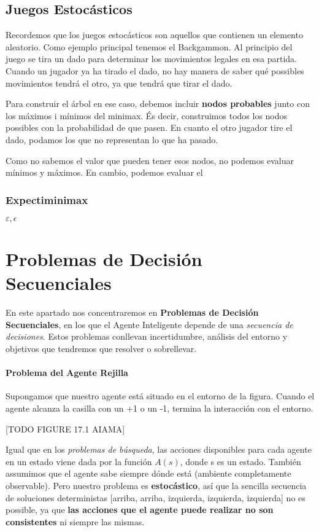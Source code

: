 \documentclass[12pt,a4paper,catalan, leqno]{article} %
\theoremstyle{definition}
\begin{document}
\subsection{Juegos Estocásticos}

Recordemos que los juegos estocásticos son aquellos que contienen un elemento aleatorio. Como ejemplo principal tenemos el Backgammon. Al principio del juego se tira un dado para determinar los movimientos legales en esa partida. Cuando un jugador ya ha tirado el dado, no hay manera de saber qué possibles movimientos tendrá el otro, ya que tendrá que tirar el dado.

Para construir el árbol en ese caso, debemos incluir \textbf{nodos probables} junto con los máximos i mínimos del minimax. És decir, construimos todos los nodos possibles con la probabilidad de que pasen. En cuanto el otro jugador tire el dado, podamos los que no representan lo que ha pasado.

Como no sabemos el valor que pueden tener esos nodos, no podemos evaluar mínimos y máximos. En cambio, podemos evaluar el 

\subsubsection{Expectiminimax}

$\varepsilon, \epsilon$

\pagebreak
\section{Problemas de Decisión Secuenciales}

En este apartado nos concentraremos en \textbf{Problemas de Decisión Secuenciales}, en los que el Agente Inteligente depende de una \textit{secuencia de decisiones}. Estos problemas conllevan incertidumbre, análisis del entorno y objetivos que tendremos que resolver o sobrellevar.

\paragraph{Problema del Agente Rejilla}

Supongamos que nuestro agente está situado en el entorno de la figura. Cuando el agente alcanza la casilla con un +1 o un -1, termina la interacción con el entorno.

[TODO FIGURE 17.1 AIAMA]

Igual que en los \textit{problemas de búsqueda}, las acciones disponibles para cada agente en un estado viene dada por la función $A(s)$, donde s es un estado. También assumimos que el agente sabe siempre dónde está (ambiente completamente observable). Pero nuestro problema  es \textbf{estocástico}, así que la sencilla secuencia de soluciones deterministas [arriba, arriba, izquierda, izquierda, izquierda] no es possible, ya que \textbf{las acciones que el agente puede realizar no son consistentes} ni siempre las mismas.
\end{document}
